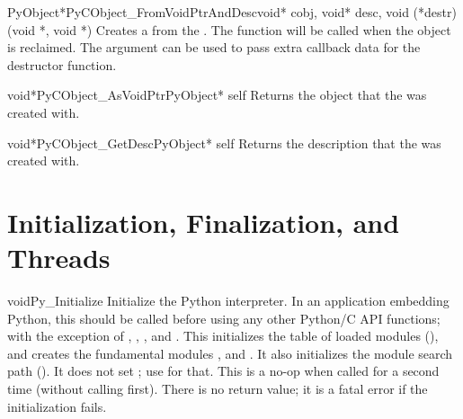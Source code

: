 \documentclass{manual}
\begin{document}
\begin{cfuncdesc}{PyObject*}{PyCObject_FromVoidPtrAndDesc}{void* cobj,
	void* desc, void (*destr)(void *, void *) }
Creates a  from the .  The
 function will be called when the object is reclaimed.  The
 argument can be used to pass extra callback data for the
destructor function.
\end{cfuncdesc}

\begin{cfuncdesc}{void*}{PyCObject_AsVoidPtr}{PyObject* self}
Returns the object  that the
  was created with.
\end{cfuncdesc}

\begin{cfuncdesc}{void*}{PyCObject_GetDesc}{PyObject* self}
Returns the description  that the
  was created with.
\end{cfuncdesc}


\chapter{Initialization, Finalization, and Threads
         \label{initialization}}

\begin{cfuncdesc}{void}{Py_Initialize}{}
Initialize the Python interpreter.  In an application embedding 
Python, this should be called before using any other Python/C API 
functions; with the exception of
,
,
,
and .
This initializes the table of loaded modules (), and
creates the
fundamental modules ,
 and
.  It also initializes the module
search path ().
It does not set ; use
 for that.  This
is a no-op when called for a second time (without calling
 first).  There is no
return value; it is a fatal error if the initialization fails.
\end{cfuncdesc}
\end{document}
